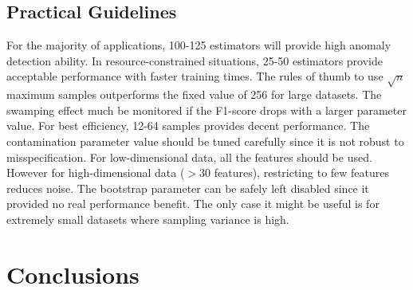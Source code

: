 \documentclass[10pt, conference]{IEEEtran}
\begin{document}
\subsection{Practical Guidelines}
For the majority of applications, 100-125 estimators will provide high anomaly detection ability. In resource-constrained situations, 25-50 estimators provide acceptable performance with faster training times. The rules of thumb to use $\sqrt{n}$ maximum samples outperforms the fixed value of 256 for large datasets. The swamping effect much be monitored if the F1-score drops with a larger parameter value. For best efficiency, 12-64 samples provides decent performance. The contamination parameter value should be tuned carefully since it is not robust to misspecification. For low-dimensional data, all the features should be used. However for high-dimensional data ($> 30$ features), restricting to few features reduces noise. The bootstrap parameter can be safely left disabled since it provided no real performance benefit. The only case it might be useful is for extremely small datasets where sampling variance is high.

\section{Conclusions}





\appendices
\end{document}
